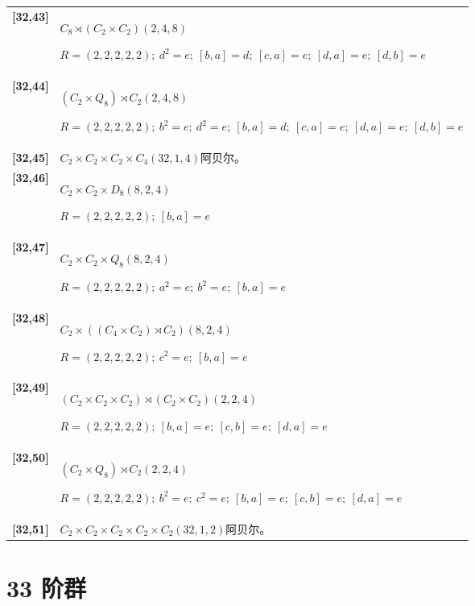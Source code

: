 \documentclass[UTF8,fontset=fandol,11pt,a4paper]{ctexart}
\begin{document}
\begin{longtable}{@{}p{17mm}>{\raggedright\arraybackslash}p{141mm}@{}}
\textbf{[32,43]} & $C_{8}\rtimes (C_{2}\times C_{2})$\quad $(2,4,8)$\par\(R=(2,2,2,2,2);\allowbreak\ d^{2}=e;\allowbreak\ [b,a]=d;\allowbreak\ [c,a]=e;\allowbreak\ [d,a]=e;\allowbreak\ [d,b]=e\)\\[3pt]

\textbf{[32,44]} & $(C_{2}\times Q_{8})\rtimes C_{2}$\quad $(2,4,8)$\par\(R=(2,2,2,2,2);\allowbreak\ b^{2}=e;\allowbreak\ d^{2}=e;\allowbreak\ [b,a]=d;\allowbreak\ [c,a]=e;\allowbreak\ [d,a]=e;\allowbreak\ [d,b]=e\)\\[3pt]

\textbf{[32,45]} & $C_{2}\times C_{2}\times C_{2}\times C_{4}$\quad $(32,1,4)$\quad 阿贝尔。\\[3pt]

\textbf{[32,46]} & $C_{2}\times C_{2}\times D_{8}$\quad $(8,2,4)$\par\(R=(2,2,2,2,2);\allowbreak\ [b,a]=e\)\\[3pt]

\textbf{[32,47]} & $C_{2}\times C_{2}\times Q_{8}$\quad $(8,2,4)$\par\(R=(2,2,2,2,2);\allowbreak\ a^{2}=e;\allowbreak\ b^{2}=e;\allowbreak\ [b,a]=e\)\\[3pt]

\textbf{[32,48]} & $C_{2}\times ((C_{4}\times C_{2})\rtimes C_{2})$\quad $(8,2,4)$\par\(R=(2,2,2,2,2);\allowbreak\ c^{2}=e;\allowbreak\ [b,a]=e\)\\[3pt]

\textbf{[32,49]} & $(C_{2}\times C_{2}\times C_{2})\rtimes (C_{2}\times C_{2})$\quad $(2,2,4)$\par\(R=(2,2,2,2,2);\allowbreak\ [b,a]=e;\allowbreak\ [c,b]=e;\allowbreak\ [d,a]=e\)\\[3pt]

\textbf{[32,50]} & $(C_{2}\times Q_{8})\rtimes C_{2}$\quad $(2,2,4)$\par\(R=(2,2,2,2,2);\allowbreak\ b^{2}=e;\allowbreak\ c^{2}=e;\allowbreak\ [b,a]=e;\allowbreak\ [c,b]=e;\allowbreak\ [d,a]=e\)\\[3pt]

\textbf{[32,51]} & $C_{2}\times C_{2}\times C_{2}\times C_{2}\times C_{2}$\quad $(32,1,2)$\quad 阿贝尔。\\[3pt]

\end{longtable}\endgroup

\section*{33 阶群}\label{order:33}
\end{document}
